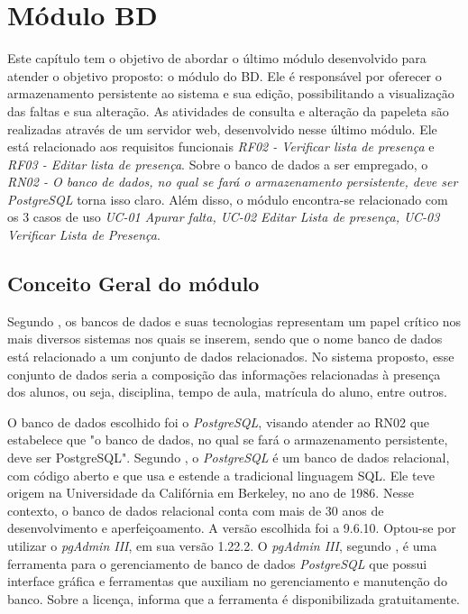 \chapter{Módulo BD}
\noindent
Este capítulo tem o objetivo de abordar o último módulo desenvolvido para atender o objetivo proposto: o módulo do BD. Ele é responsável por oferecer o armazenamento persistente ao sistema e sua edição, possibilitando a visualização das faltas e sua alteração. As atividades de consulta e alteração da papeleta são realizadas através de um servidor web, desenvolvido nesse último módulo. Ele está relacionado aos requisitos funcionais \textit{RF02 - Verificar lista de presença} e   \textit{RF03 - Editar lista de presença}. Sobre o banco de dados a ser empregado, o \textit{RN02 - O banco de dados, no qual se fará o armazenamento persistente, deve ser PostgreSQL} torna isso claro. Além disso, o módulo encontra-se relacionado com os 3 casos de uso \textit{UC-01 Apurar falta, UC-02 Editar Lista de presença, UC-03 Verificar Lista de Presença}.

\section{Conceito Geral do módulo}
\noindent
Segundo \citep{bd}, os bancos de dados e suas tecnologias representam um papel crítico nos mais diversos sistemas nos quais se inserem, sendo que o nome banco de dados está relacionado a um conjunto de dados relacionados. No sistema proposto, esse conjunto de dados seria a composição das informações relacionadas à presença dos alunos, ou seja, disciplina, tempo de aula, matrícula do aluno, entre outros.

O banco de dados escolhido foi o \textit{PostgreSQL}, visando atender ao RN02 que estabelece que "o banco de dados, no qual se fará o armazenamento persistente, deve ser PostgreSQL". Segundo \citep{postsql}, o \textit{PostgreSQL} é um banco de dados relacional, com código aberto e que usa e estende a tradicional linguagem SQL. Ele teve origem na Universidade da Califórnia em Berkeley, no ano de 1986. Nesse contexto, o banco de dados relacional conta com mais de 30 anos de desenvolvimento e aperfeiçoamento. A versão escolhida foi a 9.6.10. Optou-se por utilizar o \textit{pgAdmin III}, em sua versão 1.22.2. O \textit{pgAdmin III}, segundo \citep{pgadmin}, é uma ferramenta para o gerenciamento de banco de dados \textit{PostgreSQL} que possui interface gráfica e ferramentas que auxiliam no gerenciamento e manutenção do banco. Sobre a licença, \citep{pgadmin} informa que a ferramenta é disponibilizada gratuitamente. 


